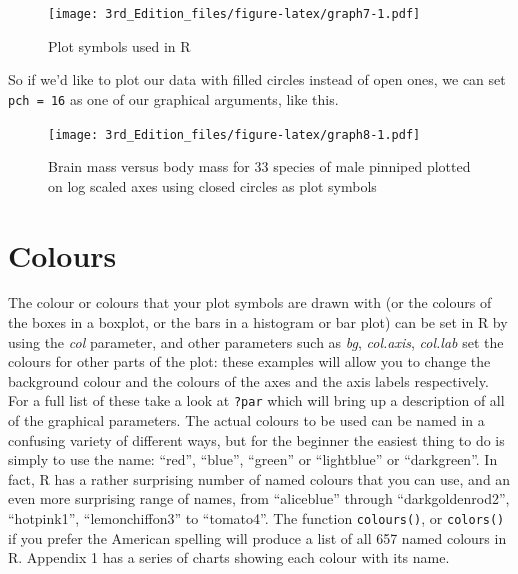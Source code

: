 \documentclass[
]{book}
\newenvironment{Shaded}{\begin{snugshade}}{\end{snugshade}}
\newcommand{\DataTypeTok}[1]{\textcolor[rgb]{0.13,0.29,0.53}{#1}}
\newcommand{\DecValTok}[1]{\textcolor[rgb]{0.00,0.00,0.81}{#1}}
\newcommand{\KeywordTok}[1]{\textcolor[rgb]{0.13,0.29,0.53}{\textbf{#1}}}
\newcommand{\NormalTok}[1]{#1}
\newcommand{\OperatorTok}[1]{\textcolor[rgb]{0.81,0.36,0.00}{\textbf{#1}}}
\newcommand{\StringTok}[1]{\textcolor[rgb]{0.31,0.60,0.02}{#1}}
\begin{document}
\begin{figure}
\centering
\texttt{[image: 3rd\_Edition\_files/figure-latex/graph7-1.pdf]}
\caption{\label{fig:graph7}Plot symbols used in R}
\end{figure}

So if we'd like to plot our data with filled circles instead of open ones, we can set \texttt{pch\ =\ 16} as one of our graphical arguments, like this.

\begin{Shaded}
\end{Shaded}

\begin{figure}
\centering
\texttt{[image: 3rd\_Edition\_files/figure-latex/graph8-1.pdf]}
\caption{\label{fig:graph8}Brain mass versus body mass for 33 species of male pinniped plotted on log scaled axes using closed circles as plot symbols}
\end{figure}

\hypertarget{colours}{%
\section{Colours}\label{colours}}

The colour or colours that your plot symbols are drawn with (or the colours of the boxes in a boxplot, or the bars in a histogram or bar plot) can be set in R by using the \emph{col} parameter, and other parameters such as \emph{bg}, \emph{col.axis}, \emph{col.lab} set the colours for other parts of the plot: these examples will allow you to change the background colour and the colours of the axes and the axis labels respectively. For a full list of these take a look at \texttt{?par} which will bring up a description of all of the graphical parameters. The actual colours to be used can be named in a confusing variety of different ways, but for the beginner the easiest thing to do is simply to use the name: ``red'', ``blue'', ``green'' or ``lightblue'' or ``darkgreen''. In fact, R has a rather surprising number of named colours that you can use, and an even more surprising range of names, from ``aliceblue'' through ``darkgoldenrod2'', ``hotpink1'', ``lemonchiffon3'' to ``tomato4''. The function \texttt{colours()}, or \texttt{colors()} if you prefer the American spelling will produce a list of all 657 named colours in R. Appendix 1 has a series of charts showing each colour with its name.
\end{document}
